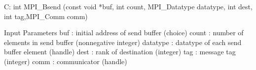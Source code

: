 C:
int MPI_Bsend
   (const void *buf, int count, MPI_Datatype datatype, 
    int dest, int tag,MPI_Comm comm)

Input Parameters
buf : initial address of send buffer (choice)
count : number of elements in send buffer (nonnegative integer)
datatype : datatype of each send buffer element (handle)
dest : rank of destination (integer)
tag : message tag (integer)
comm : communicator (handle)
